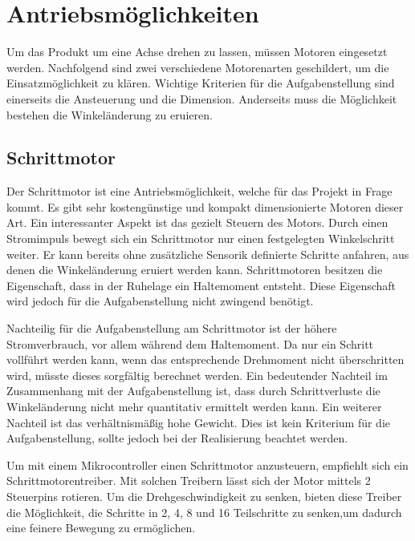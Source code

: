 \section{Antriebsmöglichkeiten}
\label{sec:Antriebsmoeglichkeiten}
Um das Produkt um eine Achse drehen zu lassen, müssen Motoren eingesetzt werden. Nachfolgend sind zwei verschiedene Motorenarten geschildert, um die Einsatzmöglichkeit zu klären. Wichtige Kriterien für die Aufgabenstellung sind einerseits die Ansteuerung und die Dimension. Anderseits muss die Möglichkeit bestehen die Winkeländerung zu eruieren. 

\subsection{Schrittmotor}
\label{subsec:Schrittmotor}
Der Schrittmotor ist eine Antriebsmöglichkeit, welche für das Projekt in Frage kommt. Es gibt sehr kostengünstige und kompakt dimensionierte Motoren dieser Art. Ein interessanter Aspekt ist das gezielt Steuern des Motors. Durch einen Stromimpuls bewegt sich ein Schrittmotor nur einen festgelegten Winkelschritt weiter. Er kann bereits ohne zusätzliche Sensorik definierte Schritte anfahren, aus denen die Winkeländerung eruiert werden kann. Schrittmotoren besitzen die Eigenschaft, dass in der Ruhelage ein Haltemoment entsteht. Diese Eigenschaft wird jedoch für die Aufgabenstellung nicht zwingend benötigt. 

Nachteilig für die Aufgabenstellung am Schrittmotor ist der höhere Stromverbrauch, vor allem während dem Haltemoment. Da nur ein Schritt vollführt werden kann, wenn das entsprechende Drehmoment nicht überschritten wird, müsste dieses sorgfältig berechnet werden. Ein bedeutender Nachteil im Zusammenhang mit der Aufgabenstellung ist, dass durch Schrittverluste die Winkeländerung nicht mehr quantitativ ermittelt werden kann.
Ein weiterer Nachteil ist das verhältnismäßig hohe Gewicht. Dies ist kein Kriterium für die Aufgabenstellung, sollte jedoch bei der Realisierung beachtet werden.

Um mit einem Mikrocontroller einen Schrittmotor anzusteuern, empfiehlt sich ein Schrittmotorentreiber. Mit solchen Treibern lässt sich der Motor mittels 2 Steuerpins rotieren. Um die Drehgeschwindigkeit zu senken, bieten diese Treiber die Möglichkeit, die Schritte in 2, 4, 8 und 16 Teilschritte zu senken,um dadurch eine feinere Bewegung zu ermöglichen. 


